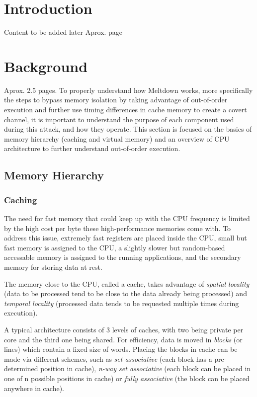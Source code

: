 \documentclass[sigconf]{acmart}
\begin{document}
\section{Introduction}

Content to be added later 
Aprox.  page



\section{Background}
Aprox. 2.5 pages.
To properly understand how Meltdown works, more specifically the steps to bypass memory isolation by taking advantage of out-of-order execution and further use timing differences in cache memory to create a covert channel, it is important to understand the purpose of each component used during this attack, and how they operate. This section is focused on the basics of memory hierarchy (caching and virtual memory) and an overview of CPU architecture to further understand out-of-order execution. 
\subsection{Memory Hierarchy}
\subsubsection{Caching}
The need for fast memory that could keep up with the CPU frequency is limited by the high cost per byte these high-performance memories come with.
To address this issue, extremely fast registers are placed inside the CPU, small but fast memory is assigned to the CPU, a slightly slower but random-based accessable memory is assigned to the running applications, and the secondary memory for storing data at rest. 

The memory close to the CPU, called a cache, takes advantage of {\itshape spatial locality} (data to be processed tend to be close to the data already being processed) and {\itshape temporal locality} (processed data tends to be requested multiple times during execution).

A typical architecture consists of 3 levels of caches, with two being private per core and the third one being shared. For efficiency, data is moved in {\itshape blocks} (or lines) which contain a fixed size of words. Placing the blocks in cache can be made via different schemes, such as {\itshape set associative} (each block has a pre-determined position in cache), {\itshape n-way set associative} (each block can be placed in one of n possible positions in cache) or {\itshape fully associative} (the block can be placed anywhere in cache).
\end{document}
